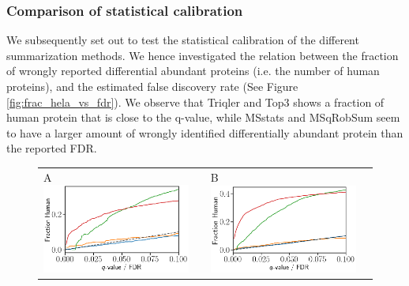 \documentclass[10pt,letterpaper]{article}
\begin{document}
\subsubsection*{Comparison of statistical calibration}

We subsequently set out to test the statistical calibration of the different summarization methods. We hence investigated the relation between the fraction of wrongly reported differential abundant proteins (i.e. the number of human proteins), and the estimated false discovery rate (See Figure \ref{fig:frac_hela_vs_fdr}). We observe that Triqler and Top3 shows a fraction of human protein that is close to the q-value, while MSstats and  MSqRobSum seem to have a larger amount of wrongly identified differentially abundant protein than the reported FDR. 

\begin{figure}[hbt]
    \centering
    \centering
    \begin{tabular}{lclc} 
        A \includegraphics[width=0.5\linewidth]{../../result/report_plots/osw_FP_DE_all.png} & &%
        B \includegraphics[width=0.5\linewidth]{../../result/report_plots/diann_FP_DE_all.png} & \\%

\end{tabular}
\end{figure}
\end{document}
